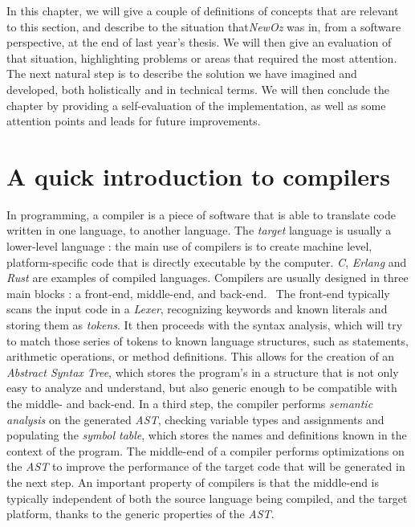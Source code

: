 
In this chapter, we will give a couple of definitions of concepts that are relevant to this section, and describe to the situation that\textit{NewOz} was in, from a software perspective, at the end of last year's thesis.
We will then give an evaluation of that situation, highlighting problems or areas that required the most attention.
The next natural step is to describe the solution we have imagined and developed, both holistically and in technical terms.
We will then conclude the chapter by providing a self-evaluation of the implementation, as well as some attention points and leads for future improvements.

\section{A quick introduction to compilers}\label{sec:ch3-compilers}
In programming, a compiler is a piece of software that is able to translate code written in one language, to another language.
The \textit{target} language is usually a lower-level language : the main use of compilers is to create machine level, platform-specific code that is directly executable by the computer.
\textit{C}, \textit{Erlang} and \textit{Rust} are examples of compiled languages.
Compilers are usually designed in three main blocks : a front-end, middle-end, and back-end.~\cite{wikiCompiler}\newline
The front-end typically scans the input code in a \textit{Lexer}, recognizing keywords and known literals and storing them as \textit{tokens}.
It then proceeds with the syntax analysis, which will try to match those series of tokens to known language structures, such as statements, arithmetic operations, or method definitions.
This allows for the creation of an \textit{Abstract Syntax Tree}, which stores the program's in a structure that is not only easy to analyze and understand, but also generic enough to be compatible with the middle- and back-end.
In a third step, the compiler performs \textit{semantic analysis} on the generated \textit{AST}, checking variable types and assignments and populating the \textit{symbol table}, which stores the names and definitions known in the context of the program.\newline
The middle-end of a compiler performs optimizations on the \textit{AST} to improve the performance of the target code that will be generated in the next step.
An important property of compilers is that the middle-end is typically independent of both the source language being compiled, and the target platform, thanks to the generic properties of the \textit{AST}.
